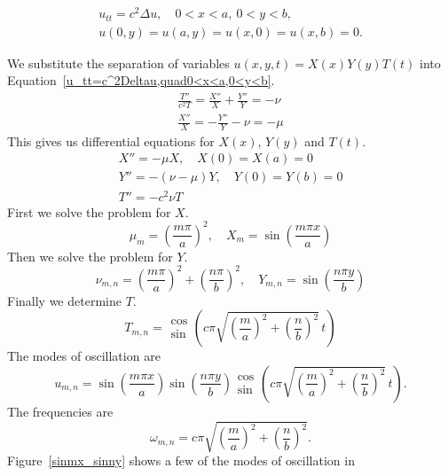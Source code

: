 {%
\begin{Solution}
  \label{solution rectangular drum head modes}
  \begin{gather}
    \label{u_tt=c^2Deltau,quad0<x<a,0<y<b}
    u_{t t} = c^2 \Delta u, \quad 0 < x < a,\ 0 < y < b, \\
    \nonumber
    u(0,y) = u(a,y) = u(x,0) = u(x,b) = 0.
  \end{gather}



  We substitute the separation of variables $u(x,y,t) = X(x) Y(y) T(t)$
  into Equation~\ref{u_tt=c^2Deltau,quad0<x<a,0<y<b}.
  \begin{gather*}
    \frac{ T'' }{ c^2 T } = \frac{ X'' }{ X } + \frac{ Y'' }{ Y }
    = - \nu \\
    \frac{ X'' }{ X } = - \frac{ Y'' }{ Y } - \nu = - \mu
  \end{gather*}
  This gives us differential equations for $X(x)$, $Y(y)$ and $T(t)$.
  \begin{gather*}
    X'' = - \mu X, \quad X(0) = X(a) = 0 \\
    Y'' = - (\nu - \mu) Y, \quad Y(0) = Y(b) = 0 \\
    T'' = - c^2 \nu T
  \end{gather*}
  First we solve the problem for $X$.
  \[
  \mu_m = \left( \frac{ m \pi }{ a } \right)^2, \quad
  X_m = \sin \left( \frac{ m \pi x }{ a } \right)
  \]
  Then we solve the problem for $Y$.
  \[
  \nu_{m,n} = \left( \frac{ m \pi }{ a } \right)^2
  + \left( \frac{ n \pi }{ b } \right)^2, \quad
  Y_{m,n} = \sin \left( \frac{ n \pi y }{ b } \right)
  \]
  Finally we determine $T$.
  \[
  T_{m,n} = \begin{matrix} \cos \\ \sin \end{matrix}
  \left( c \pi \sqrt{ \left( \frac{ m }{ a } \right)^2
      + \left( \frac{ n }{ b } \right)^2 }\, t \right)
  \]
  The modes of oscillation are
  \[
  u_{m,n} = \sin \left( \frac{ m \pi x }{ a } \right)
  \sin \left( \frac{ n \pi y }{ b } \right)
  \begin{matrix} \cos \\ \sin \end{matrix}
  \left( c \pi \sqrt{ \left( \frac{ m }{ a } \right)^2
      + \left( \frac{ n }{ b } \right)^2 }\, t \right).
  \]
  The frequencies are
  \[
  \omega_{m,n} = c \pi \sqrt{ \left( \frac{ m }{ a } \right)^2
    + \left( \frac{ n }{ b } \right)^2 }.
  \]
  Figure~\ref{sinmx_sinny} shows a few of the modes of oscillation in

\end{Solution}}
